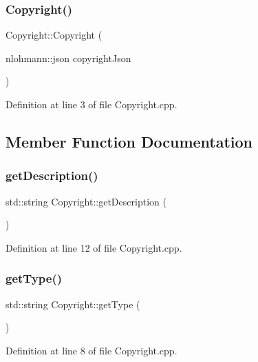 \subsubsection{\texorpdfstring{Copyright()}{Copyright()}}
{\footnotesize\ttfamily Copyright\+::\+Copyright (\begin{DoxyParamCaption}\item[{nlohmann\+::json}]{copyright\+Json }\end{DoxyParamCaption})}



Definition at line 3 of file Copyright.\+cpp.



\subsection{Member Function Documentation}
\mbox{\label{class_copyright_a095515cc84989cd76736037a9b3b1e3c}} 
\subsubsection{\texorpdfstring{get\+Description()}{getDescription()}}
{\footnotesize\ttfamily std\+::string Copyright\+::get\+Description (\begin{DoxyParamCaption}{ }\end{DoxyParamCaption})}



Definition at line 12 of file Copyright.\+cpp.

\mbox{\label{class_copyright_a2ba8fa195b324e5193f31236f2c33d40}} 
\subsubsection{\texorpdfstring{get\+Type()}{getType()}}
{\footnotesize\ttfamily std\+::string Copyright\+::get\+Type (\begin{DoxyParamCaption}{ }\end{DoxyParamCaption})}



Definition at line 8 of file Copyright.\+cpp.




